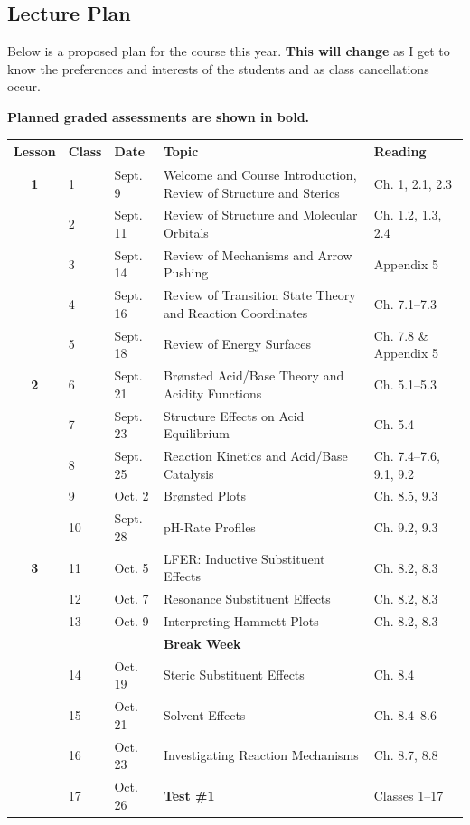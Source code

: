 \subsection{Lecture Plan}

Below is a proposed plan for the course this year. \textbf{This will change} as I get to know the preferences and interests of the students and as class cancellations occur.

\textbf{Planned graded assessments are shown in bold.}

\begin{longtable}{cp{0.8cm}p{1.8cm}p{7cm}p{3cm}}
\toprule
Lesson & Class & Date & Topic & Reading \\
\midrule
\textbf{1} & 1 & Sept. 9 & Welcome and Course Introduction, Review of Structure and Sterics & Ch. 1, 2.1, 2.3 \\
 & 2 & Sept. 11 & Review of Structure and Molecular Orbitals & Ch. 1.2, 1.3, 2.4 \\
 & 3 & Sept. 14 & Review of Mechanisms and Arrow Pushing & Appendix 5 \\
 & 4 & Sept. 16 & Review of Transition State Theory and Reaction Coordinates & Ch. 7.1--7.3 \\
 & 5 & Sept. 18 & Review of Energy Surfaces & Ch. 7.8 \& Appendix 5 \\
\textbf{2} & 6 & Sept. 21 & Brønsted Acid/Base Theory and Acidity Functions & Ch. 5.1--5.3 \\
 & 7 & Sept. 23 & Structure Effects on Acid Equilibrium & Ch. 5.4 \\
 & 8 & Sept. 25 & Reaction Kinetics and Acid/Base Catalysis & Ch. 7.4--7.6, 9.1, 9.2 \\
 & 9 & Oct. 2 & Brønsted Plots & Ch. 8.5, 9.3 \\
 & 10 & Sept. 28 & pH-Rate Profiles & Ch. 9.2, 9.3 \\
\textbf{3} & 11 & Oct. 5 & LFER: Inductive Substituent Effects & Ch. 8.2, 8.3 \\
 & 12 & Oct. 7 & Resonance Substituent Effects & Ch. 8.2, 8.3 \\
 & 13 & Oct. 9 & Interpreting Hammett Plots & Ch. 8.2, 8.3 \\
 & & & \textbf{Break Week} & \\
 & 14 & Oct. 19 & Steric Substituent Effects & Ch. 8.4 \\
 & 15 & Oct. 21 & Solvent Effects & Ch. 8.4--8.6 \\
 & 16 & Oct. 23 & Investigating Reaction Mechanisms & Ch. 8.7, 8.8 \\
 & 17 & Oct. 26 & \textbf{Test \#1} & Classes 1--17 \\
\bottomrule
\end{longtable}

